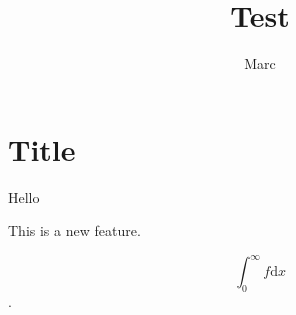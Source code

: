 \documentclass{article}
\begin{document}
\author{Marc}
\title{Test}
\maketitle

\section{Title}
\label{sec:title}
Hello

This is a new feature.

$$ \int_0^\infty f \mathrm{d}x $$.
\end{document}
